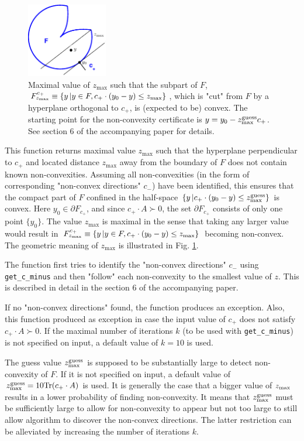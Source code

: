 \documentclass[a4paper]{article}
\theoremstyle{definition}
\begin{document}
\begin{enumerate}
\begin{figure}[H]
	\centering\includegraphics[width=100pt]{fig/get_z_max}
\captionsetup{width=.8\linewidth}
	\caption{Maximal value of $z_{\max}$ such that  the subpart of $F$, $F^{c_+}_{z_{\rm max}}\equiv \{y\, | y\in F, c_+ \cdot (y_0-y)\leq z_{\rm max}\}$, which is "cut" from $F$ by a hyperplane orthogonal  to $c_+$, is (expected to be) convex. The starting point for the non-convexity certificate is $y=y_0-z^{\rm guess}_{\rm max}c_+$. See section 6 of the accompanying paper for details.}
\label{fig:four}
\end{figure}


This function returns maximal value $z_{\max}$ such that the hyperplane perpendicular to $c_+$ and located distance $z_{\max}$ away from the boundary of $F$ does not contain known non-convexities. Assuming all non-convexities (in the form of corresponding "non-convex directions" $c_-$) have been identified, this ensures that the compact part of $F$ confined in the half-space $\{y\, |c_+ \cdot (y_0-y)\leq z^{\rm guess}_{\rm max}\}$ is convex.
Here $y_0\in \partial F_{c_+}$, and since $c_+\cdot A\succ 0$, the set $\partial F_{c_+}$ consists of only one point $\{y_0\}$.
The value $z_{\max}$ is maximal in the sense that taking any larger value would result in $F^{c_+}_{z_{\rm max}}\equiv \{y\, | y\in F, c_+ \cdot (y_0-y)\leq z_{\rm max}\}$ becoming non-convex. The geometric meaning of $z_{\max}$ is illustrated in Fig. \ref{fig:four}. 

The function first tries to identify the "non-convex directions" $c_-$ using {\tt get\_c\_minus} and then "follow" each non-convexity to the smallest value of $z$. This is described in detail in the section 6 of the accompanying paper.

If no "non-convex directions" found, the function produces an exception.
Also, this function produced as exception in case the input value of $c_+$ does not satisfy $c_+\cdot A\succ 0$.
If the maximal number of iterations $k$ (to be used with {\tt get\_c\_minus}) is not specified on input, a default value of $k=10$ is used.

The guess value $z^{\rm guess}_{\rm max}$ is supposed to be substantially large to detect non-convexity of $F$.
If it is not specified on input, a default value of $z^{\rm guess}_{\rm max}=10 {\rm Tr}(c_+\cdot A)$ is used.
It is generally the case that a bigger value of $z_{\rm max}$ results in a lower probability of finding non-convexity.
It means that $z_{\rm max}^{\rm guess}$ must be sufficiently large to allow for non-convexity to appear but not too large to still allow algorithm to discover the non-convex directions. The latter restriction can be alleviated by increasing the number of iterations $k$.


\end{enumerate}
\end{document}
